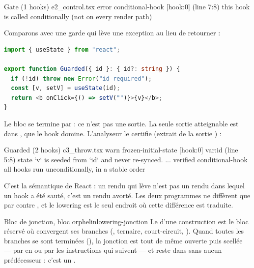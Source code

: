 \begin{sortie}
  Gate  (1 hooks)  e2_control.tsx
    error  conditional-hook  [hook:0]  (line 7:8)  this hook is called conditionally (not on every render path)
\end{sortie}

Comparons avec une garde qui lève une exception au lieu de retourner :

\begin{lstlisting}[language=TypeScript,caption={Une garde-\code{throw} (\file{/tmp/ch07/c3_throw.tsx})},label={lst:lowering-throw}]
import { useState } from "react";

export function Guarded({ id }: { id?: string }) {
  if (!id) throw new Error("id required");
  const [v, setV] = useState(id);
  return <b onClick={() => setV("")}>{v}</b>;
}
\end{lstlisting}


Le bloc  se termine par  : ce n'est pas une sortie. La seule sortie atteignable est dans , que le hook domine. L'analyseur le certifie (extrait de la sortie ) :

\begin{sortie}
  Guarded  (2 hooks)  c3_throw.tsx
    warn   frozen-initial-state  [hook:0]  var:id  (line 5:8)  state `v` is seeded from `id` and never re-synced. ...
    verified  conditional-hook  all hooks run unconditionally, in a stable order
\end{sortie}

C'est la sémantique de React : un rendu qui lève n'est pas un rendu dans lequel un hook a été sauté, c'est un rendu avorté. Les deux programmes ne diffèrent que par  contre , et le lowering est le seul endroit où cette différence est traduite.

\begin{definition}{Bloc de jonction, bloc orphelin}{lowering-jonction}
Le  d'une construction est le bloc réservé où convergent ses branches (, ternaire, court-circuit, ). Quand toutes les branches se sont terminées (), la jonction est tout de même ouverte puis scellée --- par  en  ou par les instructions qui suivent --- et reste dans  sans aucun prédécesseur : c'est un .
\end{definition}

